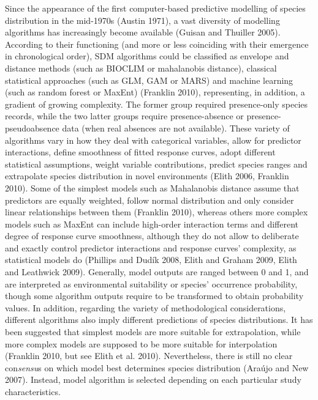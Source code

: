 \documentclass[11pt,twoside]{reedthesis}
\begin{document}
Since the appearance of the first computer-based predictive modelling of
species distribution in the mid-1970s (Austin 1971), a vast diversity of
modelling algorithms has increasingly become available (Guisan and
Thuiller 2005). According to their functioning (and more or less
coinciding with their emergence in chronological order), SDM algorithms
could be classified as envelope and distance methods (such as BIOCLIM or
mahalanobis distance), classical statistical approaches (such as GLM,
GAM or MARS) and machine learning (such as random forest or MaxEnt)
(Franklin 2010), representing, in addition, a gradient of growing
complexity. The former group required presence-only species records,
while the two latter groups require presence-absence or
presence-pseudoabsence data (when real absences are not available).
These variety of algorithms vary in how they deal with categorical
variables, allow for predictor interactions, define smoothness of fitted
response curves, adopt different statistical assumptions, weight
variable contributions, predict species ranges and extrapolate species
distribution in novel environments (Elith 2006, Franklin 2010). Some of
the simplest models such as Mahalanobis distance assume that predictors
are equally weighted, follow normal distribution and only consider
linear relationships between them (Franklin 2010), whereas others more
complex models such as MaxEnt can include high-order interaction terms
and different degree of response curve smoothness, although they do not
allow to deliberate and exactly control predictor interactions and
response curves' complexity, as statistical models do (Phillips and
Dudík 2008, Elith and Graham 2009, Elith and Leathwick 2009). Generally,
model outputs are ranged between 0 and 1, and are interpreted as
environmental suitability or species' occurrence probability, though
some algorithm outputs require to be transformed to obtain probability
values. In addition, regarding the variety of methodological
considerations, different algorithms also imply different predictions of
species distributions. It has been suggested that simplest models are
more suitable for extrapolation, while more complex models are supposed
to be more suitable for interpolation (Franklin 2010, but see Elith et
al. 2010). Nevertheless, there is still no clear con\emph{sensu}s on
which model best determines species distribution (Araújo and New 2007).
Instead, model algorithm is selected depending on each particular study
characteristics.\par
\end{document}

